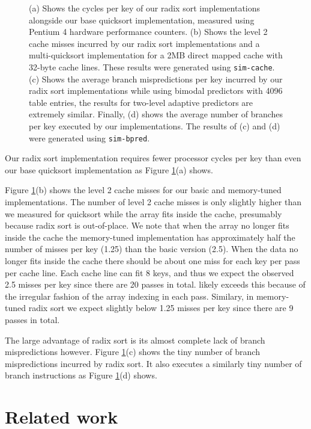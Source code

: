 \documentclass[acmtocl]{acmtrans2m}
\begin{document}
\begin{figure}
\caption{(a) Shows the cycles per key of our radix sort implementations
alongside our base quicksort implementation, measured using Pentium 4 hardware
performance counters. (b) Shows the level 2 cache misses incurred by our radix
sort implementations and a multi-quicksort implementation for a 2MB direct
mapped cache with 32-byte cache lines. These results were generated using
\texttt{sim-cache}.  (c) Shows the average branch mispredictions per key
incurred by our radix sort implementations while using bimodal predictors with
4096 table entries, the results for two-level adaptive predictors are extremely
similar. Finally, (d) shows the average number of branches per key executed by
our  implementations. The results of (c) and (d) were generated using
\texttt{sim-bpred}.}
\label{radixsort_results_pictures}
\end{figure}

Our radix sort implementation requires fewer processor cycles per key than even
our base quicksort implementation as Figure \ref{radixsort_results_pictures}(a)
shows. 

Figure \ref{radixsort_results_pictures}(b) shows the level 2 cache misses for
our basic and memory-tuned implementations.  The number of level 2 cache misses
is only slightly higher than we measured for quicksort while the array fits
inside the cache, presumably because radix sort is out-of-place.  We note that
when the array no longer fits inside the cache the memory-tuned implementation
has approximately half the number of misses per key (1.25) than the basic
version (2.5). When the data no longer fits inside the cache there should be
about one miss for each key per pass per cache line.  Each cache line can fit 8
keys, and thus we expect the observed 2.5 misses per key since there are 20
passes in total.  likely exceeds this because of the irregular fashion of the
array indexing in each pass. Similary, in memory-tuned radix sort we expect
slightly below 1.25 misses per key since there are 9 passes in total.

The large advantage of radix sort is its almost complete lack of branch
mispredictions however. Figure \ref{radixsort_results_pictures}(c) shows the
tiny number of branch mispredictions incurred by radix sort. It also executes a
similarly tiny number of branch instructions as Figure
\ref{radixsort_results_pictures}(d) shows. 

\section{Related work} 
\label{RelatedWork}
\end{document}
